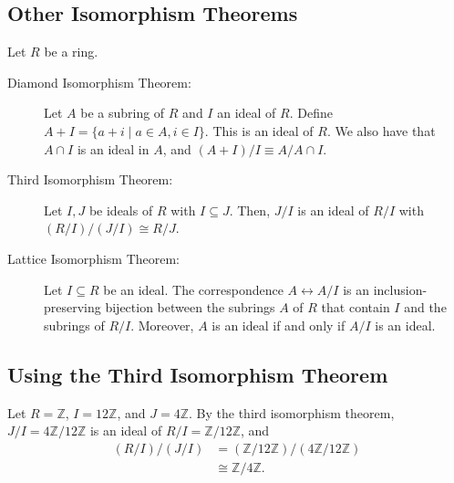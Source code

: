 \documentclass[8pt]{extarticle}
\newcommand{\Z}{\mathbb{Z}}
\begin{document}
  \subsection{Other Isomorphism Theorems}%
  Let $R$ be a ring.
  \begin{description}
    \item[Diamond Isomorphism Theorem:] Let $A$ be a subring of $R$ and $I$ an ideal of $R$. Define $A + I = \{a+i\mid a\in A,i\in I\}$. This is an ideal of $R$. We also have that $A\cap I$ is an ideal in $A$, and $(A+I)/I \equiv A/A\cap I$.
  \end{description}
  \begin{center}
  \end{center}
  \begin{description}
    \item[Third Isomorphism Theorem:] Let $I,J$ be ideals of $R$ with $I\subseteq J$. Then, $J/I$ is an ideal of $R/I$ with $(R/I)/(J/I)\cong R/J$.
    \item[Lattice Isomorphism Theorem:] Let $I\subseteq R$ be an ideal. The correspondence $A\leftrightarrow A/I$ is an inclusion-preserving bijection between the subrings $A$ of $R$ that contain $I$ and the subrings of $R/I$. Moreover, $A$ is an ideal if and only if $A/I$ is an ideal.
  \end{description}
  \subsection{Using the Third Isomorphism Theorem}%
  Let $R = \Z$, $I = 12\Z$, and $J = 4\Z$. By the third isomorphism theorem, $J/I = 4\Z/12\Z$ is an ideal of $R/I = \Z/12\Z$, and
  \begin{align*}
    (R/I)/(J/I) &= (\Z/12\Z)/(4\Z/12\Z)\\
                &\cong \Z/4\Z.
  \end{align*}
\end{document}
